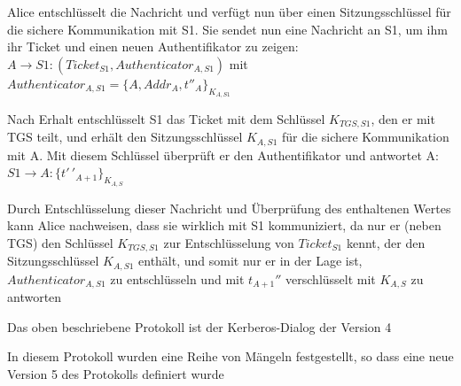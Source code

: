 \documentclass[a4paper]{article}
\begin{document}
\begin{multicols}{3}
\begin{itemize*}
            \item Alice entschlüsselt die Nachricht und verfügt nun über einen Sitzungsschlüssel für die sichere Kommunikation mit S1. Sie sendet nun eine Nachricht an S1, um ihm ihr Ticket und einen neuen Authentifikator zu zeigen: $A\rightarrow S1:(Ticket_{S1}, Authenticator_{A,S1})$ mit $Authenticator_{A,S1}=\{A,Addr_A, t''_{A}\}_{K_{A,S1}}$
            \item Nach Erhalt entschlüsselt S1 das Ticket mit dem Schlüssel $K_{TGS,S1}$, den er mit TGS teilt, und erhält den Sitzungsschlüssel $K_{A,S1}$ für die sichere Kommunikation mit A. Mit diesem Schlüssel überprüft er den Authentifikator und antwortet A: $S1\rightarrow A:\{t'\,'_{A+1}\}_{K_{A,S}}$
            \item Durch Entschlüsselung dieser Nachricht und Überprüfung des enthaltenen Wertes kann Alice nachweisen, dass sie wirklich mit S1 kommuniziert, da nur er (neben TGS) den Schlüssel $K_{TGS,S1}$ zur Entschlüsselung von $Ticket_{S1}$ kennt, der den Sitzungsschlüssel $K_{A,S1}$ enthält, und somit nur er in der Lage ist, $Authenticator_{A,S1}$ zu entschlüsseln und mit $t_{A+1}''$ verschlüsselt mit $K_{A,S}$ zu antworten
            \item Das oben beschriebene Protokoll ist der Kerberos-Dialog der Version 4
            \item In diesem Protokoll wurden eine Reihe von Mängeln festgestellt, so dass eine neue Version 5 des Protokolls definiert wurde
      \end{itemize*}


\end{multicols}
\end{document}
